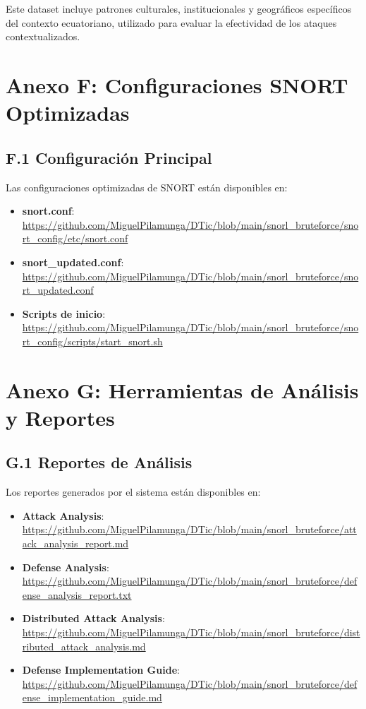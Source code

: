 Este dataset incluye patrones culturales, institucionales y geográficos específicos del contexto ecuatoriano, utilizado para evaluar la efectividad de los ataques contextualizados.

\section*{Anexo F: Configuraciones SNORT Optimizadas}

\subsection*{F.1 Configuración Principal}
Las configuraciones optimizadas de SNORT están disponibles en:
\begin{itemize}
    \item \textbf{snort.conf}: \url{https://github.com/MiguelPilamunga/DTic/blob/main/snorl_bruteforce/snort_config/etc/snort.conf}
    \item \textbf{snort\_updated.conf}: \url{https://github.com/MiguelPilamunga/DTic/blob/main/snorl_bruteforce/snort_updated.conf}
    \item \textbf{Scripts de inicio}: \url{https://github.com/MiguelPilamunga/DTic/blob/main/snorl_bruteforce/snort_config/scripts/start_snort.sh}
\end{itemize}

\section*{Anexo G: Herramientas de Análisis y Reportes}

\subsection*{G.1 Reportes de Análisis}
Los reportes generados por el sistema están disponibles en:
\begin{itemize}
    \item \textbf{Attack Analysis}: \url{https://github.com/MiguelPilamunga/DTic/blob/main/snorl_bruteforce/attack_analysis_report.md}
    \item \textbf{Defense Analysis}: \url{https://github.com/MiguelPilamunga/DTic/blob/main/snorl_bruteforce/defense_analysis_report.txt}
    \item \textbf{Distributed Attack Analysis}: \url{https://github.com/MiguelPilamunga/DTic/blob/main/snorl_bruteforce/distributed_attack_analysis.md}
    \item \textbf{Defense Implementation Guide}: \url{https://github.com/MiguelPilamunga/DTic/blob/main/snorl_bruteforce/defense_implementation_guide.md}
\end{itemize}

